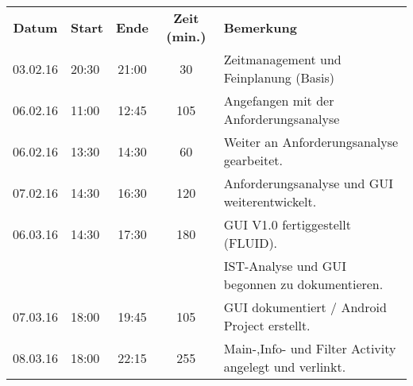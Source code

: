 \begin{tabular}{|c|l|c|c|l|}
	\rowcolor{black} {\color{white}\textbf{Datum}} & {\color{white}\textbf{Start}} & {\color{white}\textbf{Ende}} & {\color{white}\textbf{Zeit (min.)}} & {\color{white}\textbf{Bemerkung}} \\
	03.02.16 & 20:30 & 21:00 & 30 & Zeitmanagement und Feinplanung (Basis) \\ \hline
	\rowcolor{DarkSeaGreen} 06.02.16 & 11:00 & 12:45 & 105 & Angefangen mit der Anforderungsanalyse \\ \hline
	06.02.16 & 13:30 & 14:30 & 60 & Weiter an Anforderungsanalyse gearbeitet. \\ \hline
	\rowcolor{DarkSeaGreen} 07.02.16 & 14:30 & 16:30 & 120 & Anforderungsanalyse und GUI weiterentwickelt. \\ \hline
	06.03.16 & 14:30 & 17:30 & 180 & GUI V1.0 fertiggestellt (FLUID). \\ \hline
	\rowcolor{DarkSeaGreen} & & & & IST-Analyse und GUI begonnen zu dokumentieren. \\ \hline
	07.03.16 & 18:00 & 19:45 & 105 & GUI dokumentiert / Android Project erstellt. \\ \hline
	\rowcolor{DarkSeaGreen} 08.03.16 & 18:00 & 22:15 & 255 & Main-,Info- und Filter Activity angelegt und verlinkt. \\ \hline
\end{tabular}